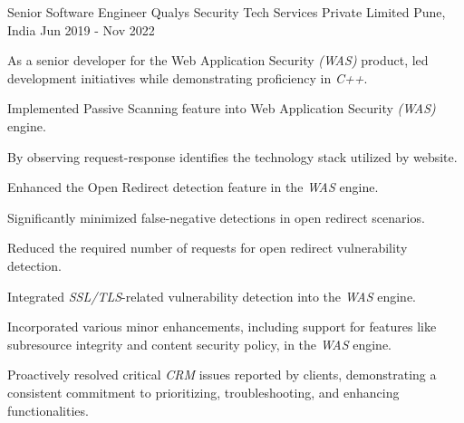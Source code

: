 \begin{cventries}
\cventry
{Senior Software Engineer} %
{Qualys Security Tech Services Private Limited} %
{Pune, India} %
{Jun 2019 - Nov 2022} %
{
\begin{cvitems}
\setlength{\itemsep}{1ex} %
%
\item {As a senior developer for the Web Application Security \textit{(WAS)} product, led development initiatives while demonstrating proficiency in \textit{C++}.}
\item {Implemented Passive Scanning feature into Web Application Security \textit{(WAS)} engine.}
    \begin{cvitemsnested}
    \item {By observing request-response identifies the technology stack utilized by website.}
    \end{cvitemsnested}
\item {Enhanced the Open Redirect detection feature in the \textit{WAS} engine.}
    \begin{cvitemsnested}
    \item {Significantly minimized false-negative detections in open redirect scenarios.}
    \item {Reduced the required number of requests for open redirect vulnerability detection.}
    \end{cvitemsnested}
\item {Integrated \textit{SSL/TLS}-related vulnerability detection into the \textit{WAS} engine.}
\item {Incorporated various minor enhancements, including support for features like subresource integrity and content security policy, in the \textit{WAS} engine.}
\item{Proactively resolved critical \textit{CRM} issues reported by clients, demonstrating a consistent commitment to prioritizing, troubleshooting, and enhancing functionalities.}
%
\end{cvitems}
}




\end{cventries}
